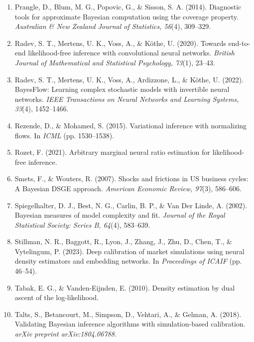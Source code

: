 \documentclass[12pt]{article}
\begin{document}
\begin{enumerate}
\item Prangle, D., Blum, M. G., Popovic, G., \& Sisson, S. A. (2014). Diagnostic tools for approximate Bayesian computation using the coverage property. \textit{Australian \& New Zealand Journal of Statistics, 56}(4), 309--329.

\item Radev, S. T., Mertens, U. K., Voss, A., \& Köthe, U. (2020). Towards end-to-end likelihood-free inference with convolutional neural networks. \textit{British Journal of Mathematical and Statistical Psychology, 73}(1), 23--43.

\item Radev, S. T., Mertens, U. K., Voss, A., Ardizzone, L., \& Köthe, U. (2022). BayesFlow: Learning complex stochastic models with invertible neural networks. \textit{IEEE Transactions on Neural Networks and Learning Systems, 33}(4), 1452--1466.

\item Rezende, D., \& Mohamed, S. (2015). Variational inference with normalizing flows. In \textit{ICML} (pp. 1530--1538).

\item Rozet, F. (2021). Arbitrary marginal neural ratio estimation for likelihood-free inference.

\item Smets, F., \& Wouters, R. (2007). Shocks and frictions in US business cycles: A Bayesian DSGE approach. \textit{American Economic Review, 97}(3), 586--606.

\item Spiegelhalter, D. J., Best, N. G., Carlin, B. P., \& Van Der Linde, A. (2002). Bayesian measures of model complexity and fit. \textit{Journal of the Royal Statistical Society: Series B, 64}(4), 583--639.

\item Stillman, N. R., Baggott, R., Lyon, J., Zhang, J., Zhu, D., Chen, T., \& Vytelingum, P. (2023). Deep calibration of market simulations using neural density estimators and embedding networks. In \textit{Proceedings of ICAIF} (pp. 46--54).

\item Tabak, E. G., \& Vanden-Eijnden, E. (2010). Density estimation by dual ascent of the log-likelihood.

\item Talts, S., Betancourt, M., Simpson, D., Vehtari, A., \& Gelman, A. (2018). Validating Bayesian inference algorithms with simulation-based calibration. \textit{arXiv preprint arXiv:1804.06788}.



\end{enumerate}
\end{document}
